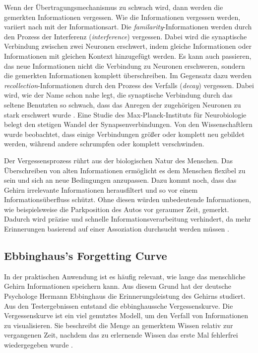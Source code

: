 Wenn der Übertragungsmechanismus zu schwach wird, dann werden die gemerkten Informationen vergessen. Wie die Informationen vergessen werden, variiert nach \cite{SA:Forget} mit der Informationsart. Die \textit{familarity}-Informationen werden durch den Prozess der Interferenz (\textit{interference}) vergessen. Dabei wird die synaptische Verbindung zwischen zwei Neuronen erschwert, indem gleiche Informationen oder Informationen mit gleichen Kontext hinzugefügt werden. Es kann auch passieren, das neue Informationen nicht die Verbindung zu Neuronen erschweren, sondern die gemerkten Informationen komplett überschreiben. Im Gegensatz dazu werden \textit{recollection}-Informationen durch den Prozess des Verfalls (\textit{decay}) vergessen. Dabei wird, wie der Name schon nahe legt, die synaptische Verbindung durch das seltene Benutzten so schwach, dass das Anregen der zugehörigen Neuronen zu stark erschwert wurde \cite{SDW:Vergessen}. Eine Studie des Max-Planck-Instituts für Neurobiologie \cite{MPI:Flex_Brain} belegt den stetigen Wandel der Synapsenverbindungen. Von den Wissenschaftlern wurde beobachtet, dass einige Verbindungen größer oder komplett neu gebildet werden, während andere schrumpfen oder komplett verschwinden.

Der Vergessensprozess rührt aus der biologischen Natur des Menschen. Das Überschreiben von alten Informationen ermöglicht es dem Menschen flexibel zu sein und sich an neue Bedingungen anzupassen. Dazu kommt noch, dass das Gehirn irrelevante Informationen herausfiltert und so vor einem Informationsüberfluss schützt. Ohne diesen würden unbedeutende Informationen, wie beispielsweise die Parkposition des Autos vor geraumer Zeit, gemerkt. Dadurch wird präzise und schnelle Informationsverarbeitung verhindert, da mehr Erinnerungen basierend auf einer Assoziation durchsucht werden müssen \cite{SDW:Vergessen}.

\subsection{Ebbinghaus's Forgetting Curve}
In der praktischen Anwendung ist es häufig relevant, wie lange das menschliche Gehirn Informationen speichern kann. Aus diesem Grund hat der deutsche Psychologe Hermann Ebbinghaus die Erinnerungsleistung des Gehirns studiert. Aus den Testergebnissen entstand die ebbinghaussche Vergessenskurve. Die Vergessenskurve ist ein viel genutztes Modell, um den Verfall von Informationen zu visualisieren. Sie beschreibt die Menge an gemerktem Wissen relativ zur vergangenen Zeit, nachdem das zu erlernende Wissen das erste Mal fehlerfrei wiedergegeben wurde \cite{Wiki:Vergessenskurve}.

